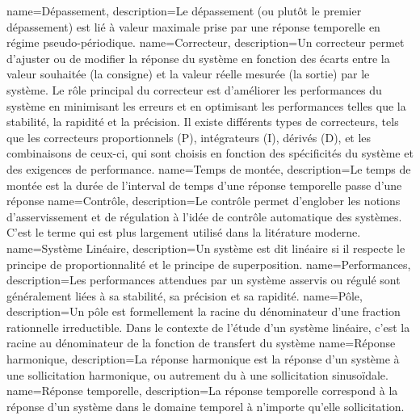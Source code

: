 %
{%
  name={Dépassement},%
  description={Le dépassement (ou plutôt le premier dépassement) 
  est lié à valeur maximale prise par une réponse temporelle en régime
  pseudo-périodique.  
  }
}
%
{%
  name={Correcteur},%
  description={Un correcteur permet d'ajuster ou 
               de modifier la réponse du système en fonction des écarts 
               entre la valeur souhaitée (la consigne) et la valeur 
               réelle mesurée (la sortie) par le système. Le rôle principal 
               du correcteur est d'améliorer les performances du système 
               en minimisant les erreurs et en optimisant les performances 
               telles que la stabilité, la rapidité et la précision. 
               Il existe différents types de correcteurs, tels que les correcteurs 
               proportionnels (P), intégrateurs (I), dérivés (D), 
               et les combinaisons de ceux-ci, qui sont choisis en fonction 
               des spécificités du système et des exigences de performance.}
}
%
{%
  name={Temps de montée},%
  description={Le temps de montée est la durée de l'interval de temps d'une 
  réponse temporelle passe d'une réponse 
  }
}
%
{%
  name={Contrôle},%
  description={Le contrôle permet d'englober les notions d'asservissement et
  de régulation à l'idée de contrôle automatique des systèmes. C'est le terme
  qui est plus largement utilisé dans la litérature moderne.  
  }
}
%
{%
  name={Système Linéaire},%
  description={Un système est dit linéaire si il respecte le principe
  de proportionnalité et le principe de superposition.
  }
}
%
{%
  name={Performances},%
  description={Les performances attendues par un système asservis ou régulé 
  sont généralement liées à sa stabilité, sa précision et sa rapidité.
  }
}
%
{%
  name={Pôle},%
  description={Un pôle est formellement la racine du dénominateur d'une
  fraction rationnelle irreductible. Dans le contexte de l'étude d'un système
  linéaire, c'est la racine au dénominateur de
  la fonction de transfert du système
  }
}
%
{%
  name={Réponse harmonique},%
  description={La réponse harmonique est la réponse d'un système à une 
  sollicitation harmonique, ou autrement du à une sollicitation sinusoïdale.
  }
}
%
{%
  name={Réponse temporelle},%
  description={La réponse temporelle correspond à la réponse d'un système 
  dans le domaine temporel à n'importe qu'elle sollicitation.
  }
}
